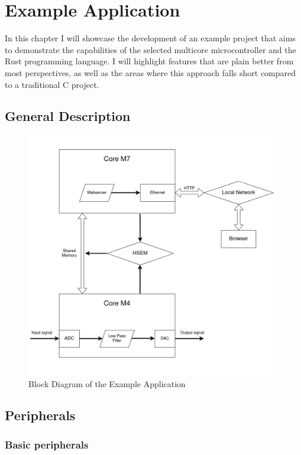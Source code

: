 \chapter{Example Application}

In this chapter I will showcase the development of an example project that aims to demonstrate the capabilities of the selected multicore microcontroller and the Rust programming language. I will highlight features that are plain better from most perspectives, as well as the areas where this approach falls short compared to a traditional C project.

\section{General Description}

\begin{figure}[!ht]
    \centering
    \includegraphics[width=150mm, keepaspectratio]{figures/example-app-flowchart.png}
    \caption{Block Diagram of the Example Application}
    \label{fig:hsem-interrupt-sd}
\end{figure}

\section{Peripherals}


\subsection{Basic peripherals}

